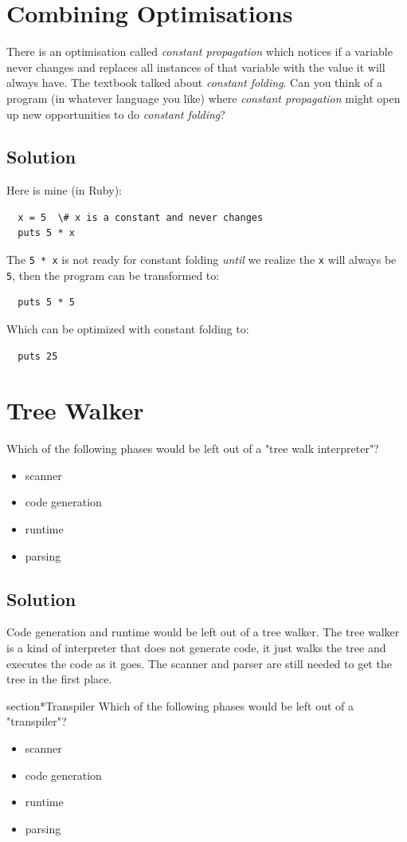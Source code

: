 \documentclass[twoside=false, DIV=14]{scrartcl}
\begin{document}
\section*{Combining Optimisations}
  There is an optimisation called \emph{constant propagation} which notices if a variable never changes and replaces all instances of that variable with the value it will always have. The textbook talked about \emph{constant folding}. Can you think of a program (in whatever language you like) where \emph{constant propagation} might open up new opportunities to do \emph{constant folding}?
\subsection*{Solution}
  Here is mine (in Ruby):
  \begin{verbatim}
  x = 5  \# x is a constant and never changes
  puts 5 * x
  \end{verbatim}
  The \texttt{5 * x} is not ready for constant folding \emph{until} we realize the \texttt{x} will always be \texttt{5}, then the program can be transformed to:
  \begin{verbatim}
  puts 5 * 5
  \end{verbatim}
  Which can be optimized with constant folding to:
  \begin{verbatim}
  puts 25
  \end{verbatim}

\section*{Tree Walker}
Which of the following phases would be left out of a "tree walk interpreter"?
\begin{itemize}
    \item scanner
    \item code generation
    \item runtime
    \item parsing
\end{itemize}
\subsection*{Solution}
Code generation and runtime would be left out of a tree walker.  The tree walker is a kind of interpreter that does not generate code, it just walks the tree and executes the code as it goes.  The scanner and parser are still needed to get the tree in the first place.

section*{Transpiler}
Which of the following phases would be left out of a "transpiler"?
\begin{itemize}
    \item scanner
    \item code generation
    \item runtime
    \item parsing
\end{itemize}
\end{document}
